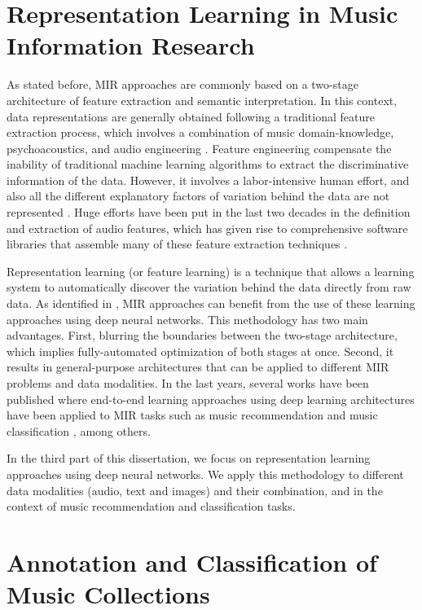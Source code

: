 \section{Representation Learning in Music Information Research}
\label{sec:intro:learning}

As stated before, MIR approaches are commonly based on a two-stage architecture of feature extraction and semantic interpretation. In this context, data representations are generally obtained following a traditional feature extraction process, which involves a combination of music domain-knowledge, psychoacoustics, and audio engineering \cite{humphrey2012}. 
Feature engineering compensate the inability of traditional machine learning algorithms to extract the discriminative information of the data. However, it involves a labor-intensive human effort, and also all the different explanatory factors of variation behind the data are not represented \cite{bengio2013representation}. 
Huge efforts have been put in the last two decades in the definition and extraction of audio features, which has given rise to comprehensive software libraries that assemble many of these feature extraction techniques \cite{bogdanov2013essentia, Mcfee2015}. 

Representation learning (or feature learning) is a technique that allows a learning system to automatically discover the variation behind the data directly from raw data. As identified in \cite{humphrey2012}, MIR approaches can benefit from the use of these learning approaches using deep neural networks. This methodology has two main advantages. First, blurring the boundaries between the two-stage architecture, which implies fully-automated optimization of both stages at once. Second, it results in general-purpose architectures that can be applied to different MIR problems and data modalities. In the last years, several works have been published where end-to-end learning approaches using deep learning architectures have been applied to MIR tasks such as music recommendation \cite{Oord2013} and music classification \cite{Choi2016}, among others.

In the third part of this dissertation, we focus on representation learning approaches using deep neural networks. We apply this methodology to different data modalities (audio, text and images) and their combination, and in the context of music recommendation and classification tasks.


\section{Annotation and Classification of Music Collections}
\label{sec:intro:annotation}

